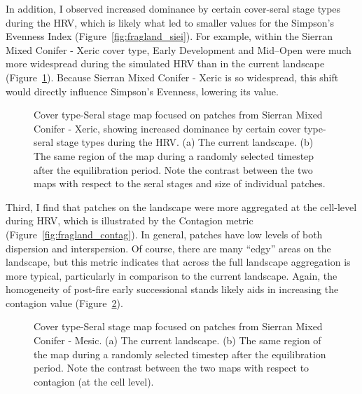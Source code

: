 
In addition, I observed increased dominance by certain cover-seral stage types during the HRV, which is likely what led to smaller values for the Simpson's Evenness Index (Figure~\ref{fig:fragland_siei}). For example, within the Sierran Mixed Conifer - Xeric cover type, Early Development and Mid--Open were much more widespread during the simulated HRV than in the current landscape (Figure~\ref{fig:patchmaps2}). Because Sierran Mixed Conifer - Xeric is so widespread, this shift would directly influence Simpson's Evenness, lowering its value.

\begin{figure}[!htbp]
  \centering
  \caption{Cover type-Seral stage map focused on patches from Sierran Mixed Conifer - Xeric, showing increased dominance by certain cover type-seral stage types during the HRV. (a) The current landscape. (b) The same region of the map during a randomly selected timestep after the equilibration period. Note the contrast between the two maps with respect to the seral stages and size of individual patches.} 
  \label{fig:patchmaps2}
\end{figure}


Third, I find that patches on the landscape were more aggregated at the cell-level during HRV, which is illustrated by the Contagion metric (Figure~\ref{fig:fragland_contag}). In general, patches have low levels of both dispersion and interspersion. Of course, there are many ``edgy'' areas on the landscape, but this metric indicates that across the full landscape aggregation is more typical, particularly in comparison to the current landscape. Again, the homogeneity of post-fire early successional stands likely aids in increasing the contagion value (Figure~\ref{fig:patchmaps3}). 

\begin{figure}[!htbp]
  \centering
  \caption{Cover type-Seral stage map focused on patches from Sierran Mixed Conifer - Mesic. (a) The current landscape. (b) The same region of the map during a randomly selected timestep after the equilibration period. Note the contrast between the two maps with respect to contagion (at the cell level).} 
  \label{fig:patchmaps3} %
\end{figure}

